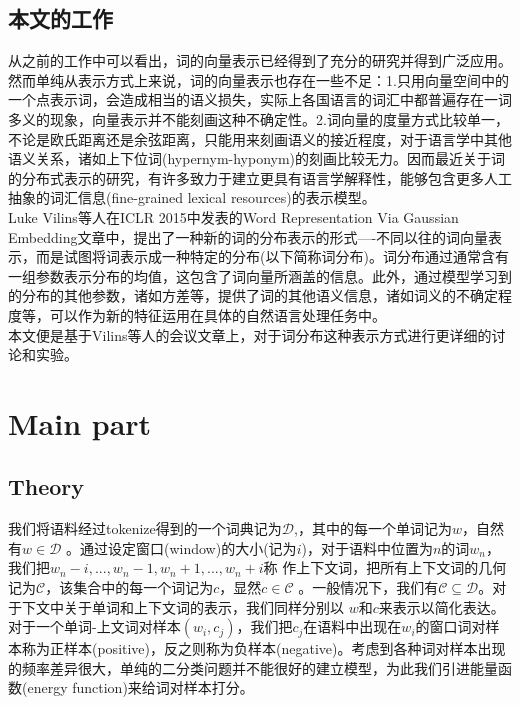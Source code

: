 \documentclass[13pt]{article}
\begin{document}
\subsection{本文的工作}
从之前的工作中可以看出，词的向量表示已经得到了充分的研究并得到广泛应用。然而单纯从表示方式上来说，词的向量表示也存在一些不足：1.只用向量空间中的一个点表示词，会造成相当的语义损失，实际上各国语言的词汇中都普遍存在一词多义的现象，向量表示并不能刻画这种不确定性。2.词向量的度量方式比较单一，不论是欧氏距离还是余弦距离，只能用来刻画语义的接近程度，对于语言学中其他语义关系，诸如上下位词(hypernym-hyponym)的刻画比较无力。因而最近关于词的分布式表示的研究，有许多致力于建立更具有语言学解释性，能够包含更多人工抽象的词汇信息(fine-grained lexical resources)的表示模型。\\

Luke Vilins等人在ICLR 2015中发表的Word Representation Via Gaussian Embedding\cite{vilnis2014word}文章中，提出了一种新的词的分布表示的形式----不同以往的词向量表示，而是试图将词表示成一种特定的分布(以下简称词分布)。词分布通过通常含有一组参数表示分布的均值，这包含了词向量所涵盖的信息。此外，通过模型学习到的分布的其他参数，诸如方差等，提供了词的其他语义信息，诸如词义的不确定程度等，可以作为新的特征运用在具体的自然语言处理任务中。\\

本文便是基于Vilins等人的会议文章上，对于词分布这种表示方式进行更详细的讨论和实验。\\

\section{Main part}
\subsection{Theory}
我们将语料经过tokenize得到的一个词典记为$\mathcal{D}$,，其中的每一个单词记为$w$，自然有$w\in\mathcal{D}$
。通过设定窗口(window)的大小(记为$i$)，对于语料中位置为$n$的词$w_n$，我们把$w_n-i,...,w_n-1,w_n+1,...,w_n+i$称
作上下文词，把所有上下文词的几何记为$\mathcal{C}$，该集合中的每一个词记为$c$，显然$c\in\mathcal{C}$
。一般情况下，我们有$\mathcal{C}\subseteq\mathcal{D}$。对于下文中关于单词和上下文词的表示，我们同样分别以
$w$和$c$来表示以简化表达。\\

对于一个单词-上文词对样本$(w_i,c_j)$，我们把$c_j$在语料中出现在$w_i$的窗口词对样本称为正样本(positive)，反之则称为负样本(negative)。考虑到各种词对样本出现的频率差异很大，单纯的二分类问题并不能很好的建立模型，为此我们引进能量函数(energy function)来给词对样本打分。\\
\end{document}
